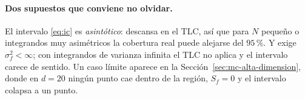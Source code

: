 \paragraph{Dos supuestos que conviene no olvidar.} El intervalo
\eqref{eq:ic} es \emph{asintótico}: descansa en el TLC, así que para $N$
pequeño o integrandos muy asimétricos la cobertura real puede alejarse del
$95\,\%$. Y exige $\sigma_f^2 < \infty$; con integrandos de varianza infinita
el TLC no aplica y el intervalo carece de sentido. Un caso límite aparece en la
Sección~\ref{sec:mc-alta-dimension}, donde en $d = 20$ ningún punto cae dentro
de la región, $S_f = 0$ y el intervalo colapsa a un punto.
